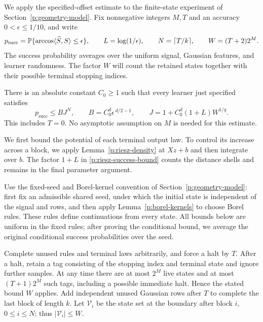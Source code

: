 We apply the specified-offset estimate to the finite-state experiment of
Section~\ref{p:geometry-model}. Fix nonnegative integers $M,T$ and an
accuracy $0<\epsilon\le1/10$, and write
\[
 p_{\mathrm{succ}}=\mathbb P\{\arccos\langle \widehat S,S\rangle\le\epsilon\},
 \qquad L=\log(1/\epsilon),\qquad
 N=\lceil T/k\rceil,\qquad W=(T+2)2^M.
\]
The success probability averages over the uniform signal, Gaussian
features, and learner randomness. The factor $W$ will count the retained
states together with their possible terminal stopping indices.

\begin{proposition}\label{p:riesz-success}
There is an absolute constant $C_0\ge1$ such that every learner just
specified satisfies
\begin{equation}\label{p:riesz-success-bound}
 p_{\mathrm{succ}}\le B J^N,\qquad
 B=C_0^d\epsilon^{\,d/2-1},\qquad
 J=1+C_0^d(1+L)W^{1/q}.
\end{equation}
This includes $T=0$.  No asymptotic assumption on $M$ is needed for
this estimate.
\end{proposition}

We first bound the potential of each terminal output law. To control its
increase across a block, we apply Lemma~\ref{p:riesz-density} at $Xz+b$
and then integrate over $b$. The factor $1+L$ in
\eqref{p:riesz-success-bound} counts the distance shells and remains
in the final parameter argument.

Use the fixed-seed and Borel-kernel convention of
Section~\ref{p:geometry-model}: first fix an admissible shared seed,
under which the initial state is independent of the signal and rows,
and then apply Lemma~\ref{p:borel-kernels} to choose Borel rules. These
rules define continuations from every state. All bounds below are uniform
in the fixed rules; after proving the conditional bound, we average the
original conditional success probabilities over the seed.

Complete unused rules and terminal laws arbitrarily, and force a halt
by $T$.  After a halt, retain a tag consisting of the stopping index
and terminal state and ignore further samples.  At any time there are
at most $2^M$ live states and at most $(T+1)2^M$ such tags, including
a possible immediate halt. Hence the stated bound $W$ applies. Add
independent unused Gaussian rows after $T$ to complete the last block of length $k$.  Let
$\mathcal V_i$ be the state set at the boundary after block $i$,
$0\le i\le N$; thus $\lvert\mathcal V_i\rvert\le W$.

